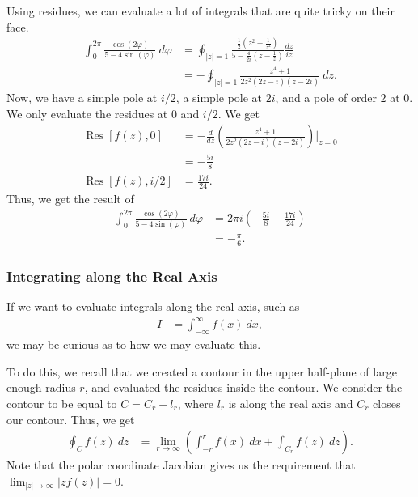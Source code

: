 \documentclass[10pt]{mypackage}
\DeclareMathOperator{\res}{Res}
\begin{document}
  \begin{example}
    Using residues, we can evaluate a lot of integrals that are quite tricky on their face.
    \begin{align*}
      \int_{0}^{2\pi} \frac{\cos\left( 2\varphi \right)}{5-4\sin\left( \varphi \right)}\:d\varphi &= \oint_{|z| = 1} \frac{\frac{1}{2}\left( z^2 + \frac{1}{z^2} \right)}{5 - \frac{4}{2i}\left( z - \frac{1}{z} \right)}\frac{dz}{iz}\\
                                                                                                  &= -\oint_{|z|=1}\frac{z^4 + 1}{2z^2\left( 2z-i \right)\left( z-2i \right)}\:dz.
    \end{align*}
    Now, we have a simple pole at $i/2$, a simple pole at $2i$, and a pole of order $2$ at $0$. We only evaluate the residues at $0$ and $i/2$. We get
    \begin{align*}
      \res\left[ f(z),0 \right] &= -\frac{d}{dz}\left( \frac{z^4 + 1}{2z^2\left( 2z-i \right)\left( z-2i \right)} \right)\biggr\vert_{z=0}\\
                                &= -\frac{5i}{8}\\
      \res\left[ f(z),i/2 \right] &= \frac{17i}{24}.
    \end{align*}
    Thus, we get the result of
    \begin{align*}
      \int_{0}^{2\pi} \frac{\cos\left( 2\varphi \right)}{5-4\sin\left( \varphi \right)}\:d\varphi &= 2\pi i \left( -\frac{5i}{8} + \frac{17i}{24} \right)\\
                                                                                                  &= -\frac{\pi}{6}.
    \end{align*}
  \end{example}
  \subsubsection{Integrating along the Real Axis}%
  If we want to evaluate integrals along the real axis, such as
  \begin{align*}
    I &= \int_{-\infty}^{\infty} f(x)\:dx,
  \end{align*}
  we may be curious as to how we may evaluate this.\newline

  To do this, we recall that we created a contour in the upper half-plane of large enough radius $r$, and evaluated the residues inside the contour. We consider the contour to be equal to $C = C_r + l_r$, where $l_r$ is along the real axis and $C_r$ closes our contour. Thus, we get
  \begin{align*}
    \oint_{C}f(z)\:dz &= \lim_{r\rightarrow\infty} \left( \int_{-r}^{r} f(x)\:dx + \int_{C_r}^{} f(z)\:dz \right).
  \end{align*}
  Note that the polar coordinate Jacobian gives us the requirement that $\lim_{|z|\rightarrow\infty}\left\vert zf(z) \right\vert = 0$. \newline
\end{document}
